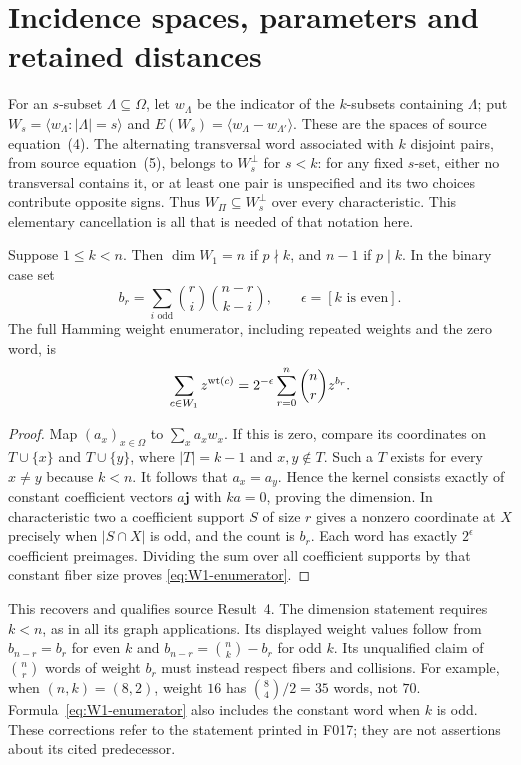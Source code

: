 \section{Incidence spaces, parameters and retained distances}
For an $s$-subset $\Lambda\subseteq\Omega$, let $w_\Lambda$ be the
indicator of the $k$-subsets containing $\Lambda$; put
$W_s=\langle w_\Lambda:|\Lambda|=s\rangle$ and
$E(W_s)=\langle w_\Lambda-w_{\Lambda'}\rangle$.
These are the spaces of source equation~(4). The alternating transversal
word associated with $k$ disjoint pairs, from source equation~(5),
belongs to $W_s^\perp$ for $s<k$: for any fixed $s$-set, either no
transversal contains it, or at least one pair is unspecified and its
two choices contribute opposite signs. Thus $W_\Pi\subseteq W_s^\perp$
over every characteristic. This elementary cancellation is all that is
needed of that notation here.

\begin{proposition}\label{prop:point-incidence}
Suppose $1\leq k<n$. Then $\dim W_1=n$ if $p\nmid k$, and $n-1$
if $p\mid k$. In the binary case set
\[
 b_r=\sum_{i\text{ odd}}\binom ri\binom{n-r}{k-i},\qquad
 \epsilon=[k\text{ is even}].
\]
The full Hamming weight enumerator, including repeated weights and the zero
word, is
\begin{equation}\label{eq:W1-enumerator}
 \sum_{c\in W_1}z^{\operatorname{wt}(c)}
     =2^{-\epsilon}\sum_{r=0}^{n}\binom nr z^{b_r}.
\end{equation}
\end{proposition}
\begin{proof}
Map $(a_x)_{x\in\Omega}$ to $\sum_xa_xw_x$.
If this is zero, compare its coordinates on $T\cup\{x\}$ and
$T\cup\{y\}$, where $|T|=k-1$ and $x,y\notin T$. Such a $T$ exists
for every $x\ne y$ because $k<n$. It follows that $a_x=a_y$.
Hence the kernel consists exactly of constant coefficient vectors
$a\mathbf j$ with $ka=0$, proving the dimension.
In characteristic two a coefficient support $S$ of size $r$ gives a
nonzero coordinate at $X$ precisely when $|S\cap X|$ is odd, and the
count is $b_r$. Each word has exactly $2^\epsilon$ coefficient
preimages. Dividing the sum over all coefficient supports by that
constant fiber size proves \eqref{eq:W1-enumerator}.
\end{proof}
This recovers and qualifies source Result~4. The dimension statement
requires $k<n$, as in all its graph applications. Its displayed weight
values follow from $b_{n-r}=b_r$ for even $k$ and
$b_{n-r}=\binom nk-b_r$ for odd $k$.
Its unqualified claim of $\binom nr$ words of weight $b_r$ must instead
respect fibers and collisions. For example, when $(n,k)=(8,2)$,
weight $16$ has $\binom84/2=35$ words, not $70$.
Formula~\eqref{eq:W1-enumerator} also includes the constant word when
$k$ is odd. These corrections refer to the statement printed in F017;
they are not assertions about its cited predecessor.


